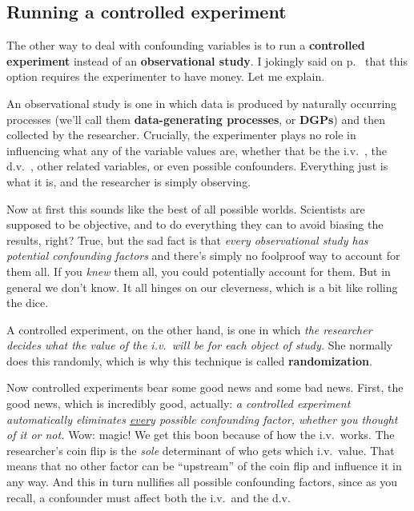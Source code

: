 \subsection{Running a controlled experiment}


The other way to deal with confounding variables is to run a \textbf{controlled
experiment} instead of an \textbf{observational study}. I jokingly said on
p.~\pageref{smart} that this option requires the experimenter to have money.
Let me explain.

An observational study is one in which data is produced by naturally occurring
processes (we'll call them \textbf{data-generating processes}, or
\textbf{DGPs}) and then collected by the researcher.
Crucially, the experimenter plays no role in influencing what any of the
variable values are, whether that be the i.v.~, the d.v.~, other related
variables, or even possible confounders. Everything just is what it is, and the
researcher is simply observing.

Now at first this sounds like the best of all possible worlds. Scientists are
supposed to be objective, and to do everything they can to avoid biasing the
results, right? True, but the sad fact is that \textit{every observational
study has potential confounding factors} and there's simply no foolproof way to
account for them all. If you \textit{knew} them all, you could potentially
account for them. But in general we don't know. It all hinges on our
cleverness, which is a bit like rolling the dice.


A controlled experiment, on the other hand, is one in which \textit{the
researcher decides what the value of the i.v.~will be for each object of
study.} She normally does this randomly, which is why this technique is called
\textbf{randomization}.

Now controlled experiments bear some good news and some bad news. First, the
good news, which is incredibly good, actually: \textit{a controlled experiment
automatically eliminates \underline{every} possible confounding factor, whether
you thought of it or not.} Wow: magic! We get this boon because of how the
i.v.~works. The researcher's coin flip is the \textit{sole} determinant of who
gets which i.v.~value. That means that no other factor can be ``upstream'' of
the coin flip and influence it in any way. And this in turn nullifies all
possible confounding factors, since as you recall, a confounder must affect
both the i.v.~and the d.v.

